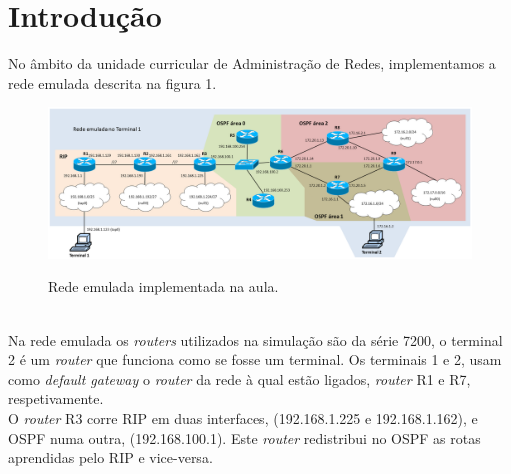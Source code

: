 \section*{Introdução}

No âmbito da unidade curricular de Administração de Redes, implementamos a rede emulada descrita na figura 1.\\
\begin{figure}[h]
\centering
\includegraphics[width=1\textwidth, height=0.33\textheight]{rede-emulada.png}
\label{fig:rede emulada}
\caption{Rede emulada implementada na aula.}
\end{figure}
\\
Na rede emulada os \emph{routers} utilizados na simulação são da série 7200, o \textsf{terminal 2} é um \emph{router} que funciona como se fosse um terminal.
Os terminais 1 e 2, usam como \emph{default gateway} o \emph{router} da rede à qual estão ligados, \emph{router} \textsf{R1} e \textsf{R7}, respetivamente.\\
O \emph{router} R3 corre RIP em duas interfaces, (192.168.1.225 e 192.168.1.162), e OSPF numa outra, (192.168.100.1). Este \emph{router} redistribui no OSPF as rotas aprendidas pelo RIP e vice-versa.
